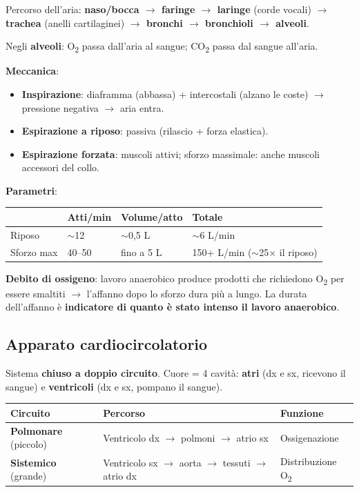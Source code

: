 \documentclass[12pt, a4paper]{article}
\begin{document}
Percorso dell'aria: \textbf{naso/bocca $\rightarrow$ faringe $\rightarrow$ laringe} (corde vocali) \textbf{$\rightarrow$ trachea} (anelli cartilaginei) \textbf{$\rightarrow$ bronchi $\rightarrow$ bronchioli $\rightarrow$ alveoli}.

Negli \textbf{alveoli}: O\textsubscript{2} passa dall'aria al sangue; CO\textsubscript{2} passa dal sangue all'aria.

\textbf{Meccanica}:
\begin{itemize}
  \item \textbf{Inspirazione}: diaframma (abbassa) + intercostali (alzano le coste) $\rightarrow$ pressione negativa $\rightarrow$ aria entra.
  \item \textbf{Espirazione a riposo}: passiva (rilascio + forza elastica).
  \item \textbf{Espirazione forzata}: muscoli attivi; sforzo massimale: anche muscoli accessori del collo.
\end{itemize}

\textbf{Parametri}:

\begin{tabular}{llll}
\toprule
\rowcolor{light} & \textbf{Atti/min} & \textbf{Volume/atto} & \textbf{Totale} \\
\midrule
Riposo & $\sim$12 & $\sim$0,5 L & $\sim$6 L/min \\
Sforzo max & 40--50 & fino a 5 L & 150+ L/min ($\sim$25$\times$ il riposo) \\
\bottomrule
\end{tabular}

\textbf{Debito di ossigeno}: lavoro anaerobico produce prodotti che richiedono O\textsubscript{2} per essere smaltiti $\rightarrow$ l'affanno dopo lo sforzo dura più a lungo. La durata dell'affanno è \textbf{indicatore di quanto è stato intenso il lavoro anaerobico}.

\subsection{Apparato cardiocircolatorio}

Sistema \textbf{chiuso a doppio circuito}. Cuore = 4 cavità: \textbf{atri} (dx e sx, ricevono il sangue) e \textbf{ventricoli} (dx e sx, pompano il sangue).

\begin{tabularx}{\textwidth}{lXX}
\toprule
\rowcolor{light} \textbf{Circuito} & \textbf{Percorso} & \textbf{Funzione} \\
\midrule
\textbf{Polmonare} (piccolo) & Ventricolo dx $\rightarrow$ polmoni $\rightarrow$ atrio sx & Ossigenazione \\
\textbf{Sistemico} (grande) & Ventricolo sx $\rightarrow$ aorta $\rightarrow$ tessuti $\rightarrow$ atrio dx & Distribuzione O\textsubscript{2} \\
\bottomrule
\end{tabularx}
\end{document}
